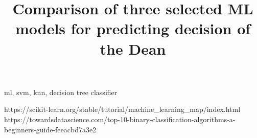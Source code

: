 \documentclass[conference]{IEEEtran}
\begin{document}
\title{Comparison of three selected ML models for predicting decision of the Dean}

\author{
\and
{}
}

\maketitle

\begin{abstract}
\end{abstract}

\begin{IEEEkeywords}
ml, svm, knn, decision tree classifier
\end{IEEEkeywords}



\begin{thebibliography}{00}
 https://scikit-learn.org/stable/tutorial/machine\_learning\_map/index.html
 https://towardsdatascience.com/top-10-binary-classification-algorithms-a-beginners-guide-feeacbd7a3e2

\end{thebibliography}
\end{document}
